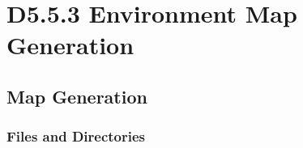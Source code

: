 \documentclass{CSSRforAfrica}
\begin{document}
  
%  



\newpage
\section{D5.5.3 Environment Map Generation} 
\subsection{Map Generation} 
\label{subsection:map_generation}

\subsubsection{Files and Directories}
 
\end{document}
